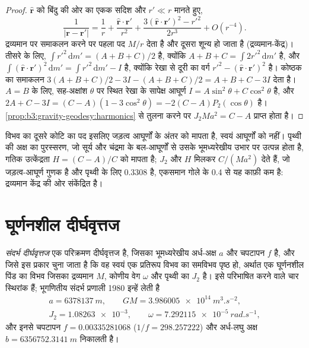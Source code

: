 \begin{proof}
$\hat{\mathbf r}$ को बिंदु की ओर का एकक सदिश और $r' \ll r$ मानते हुए,
\[
  \frac{1}{|\mathbf r - \mathbf r'|} = \frac1r + \frac{\hat{\mathbf r}\cdot\mathbf r'}{r^2}
  + \frac{3(\hat{\mathbf r}\cdot\mathbf r')^2 - r'^2}{2r^3} + O(r^{-4}).
\]
द्रव्यमान पर समाकलन करने पर पहला पद $M/r$ देता है और दूसरा शून्य हो जाता है
(द्रव्यमान-केंद्र)। तीसरे के लिए, $\int r'^2\,\mathrm dm' = (A + B + C)/2$ है, क्योंकि
$A + B + C = \int 2r'^2\,\mathrm dm'$ है, और $\int(\hat{\mathbf r}\cdot\mathbf
r')^2\,\mathrm dm' = \int r'^2\,\mathrm dm' - I$ है, क्योंकि रेखा से दूरी का वर्ग
$r'^2 - (\hat{\mathbf r}\cdot\mathbf r')^2$ है। कोष्ठक का समाकलन
$3(A + B + C)/2 - 3I - (A + B + C)/2 = A + B + C - 3I$ देता है। $A = B$ के लिए,
सह-अक्षांश $\theta$ पर स्थित रेखा के सापेक्ष आघूर्ण $I = A\sin^2\theta + C\cos^2\theta$ है,
और $2A + C - 3I = (C - A)(1 - 3\cos^2\theta) = -2(C - A)P_2(\cos\theta)$ है।
\cref{prop:b3:gravity-geodesy:harmonics} से तुलना करने पर
$J_2Ma^2 = C - A$ प्राप्त होता है।
\end{proof}

विभव का दूसरे कोटि का पद इसलिए जड़त्व आघूर्णों के अंतर को मापता है,
स्वयं आघूर्णों को नहीं। पृथ्वी की अक्ष का पुरस्सरण,
जो सूर्य और चंद्रमा के बल-आघूर्णों से उसके भूमध्यरेखीय उभार पर उत्पन्न होता है,
गतिक उत्केंद्रता $H = (C - A)/C$ को मापता है; $J_2$ और $H$ मिलकर
$C/(Ma^2)$ देते हैं, जो जड़त्व-आघूर्ण गुणक है और पृथ्वी के लिए \num{0.3308} है,
एकसमान गोले के \num{0.4} से यह काफ़ी कम है: द्रव्यमान
केंद्र की ओर संकेंद्रित है।

\section{घूर्णनशील दीर्घवृत्तज}

\begin{definition}[संदर्भ दीर्घवृत्तज]\label{def:b3:gravity-geodesy:ellipsoid}
\emph{संदर्भ दीर्घवृत्तज} एक परिक्रमण दीर्घवृत्तज है,
जिसका भूमध्यरेखीय अर्ध-अक्ष $a$ और चपटापन $f$ है, और जिसे इस प्रकार चुना जाता है कि वह
स्वयं एक प्रतिरूप विभव का समविभव पृष्ठ हो, अर्थात एक घूर्णनशील पिंड का विभव जिसका
द्रव्यमान $M$, कोणीय वेग $\omega$ और पृथ्वी का 
$J_2$ है। इसे परिभाषित करने वाले चार स्थिरांक हैं; भूगणितीय संदर्भ
प्रणाली 1980 इन्हें लेती है
\begin{gather*}
  a = \qty{6378137}{m},\qquad GM = \qty{3.986005e14}{m^3.s^{-2}},\\
  J_2 = \num{1.08263e-3},\qquad \omega = \qty{7.292115e-5}{rad.s^{-1}},
\end{gather*}
और इनसे चपटापन $f = \num{0.00335281068}$
($1/f = \num{298.257222}$) और अर्ध-लघु अक्ष
$b = \qty{6356752.3141}{m}$ निकालती है।
\end{definition}

